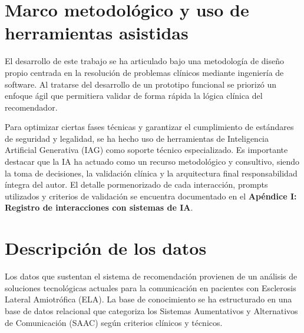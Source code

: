 
\section{Marco metodológico y uso de herramientas asistidas}
El desarrollo de este trabajo se ha articulado bajo una metodología de diseño propio centrada en la resolución de problemas clínicos mediante ingeniería de software. Al tratarse del desarrollo de un prototipo funcional se priorizó un enfoque ágil que permitiera validar de forma rápida la lógica clínica del recomendador.

Para optimizar ciertas fases técnicas y garantizar el cumplimiento de estándares de seguridad y legalidad, se ha hecho uso de herramientas de Inteligencia Artificial Generativa (IAG) como soporte técnico especializado. Es importante destacar que la IA ha actuado como un recurso metodológico y consultivo, siendo la toma de decisiones, la validación clínica y la arquitectura final responsabilidad íntegra del autor. El detalle pormenorizado de cada interacción, prompts utilizados y criterios de validación se encuentra documentado en el \textbf{Apéndice I: Registro de interacciones con sistemas de IA}.

\section{Descripción de los datos}
Los datos que sustentan el sistema de recomendación provienen de un análisis de soluciones tecnológicas actuales para la comunicación en pacientes con Esclerosis Lateral Amiotrófica (ELA). La base de conocimiento se ha estructurado en una base de datos relacional que categoriza los Sistemas Aumentativos y Alternativos de Comunicación (SAAC) según criterios clínicos y técnicos.

